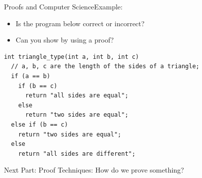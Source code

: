 \begin{frame}[fragile]{Proofs and Computer Science}{Example:}
  \begin{itemize}
    \item Is the program below correct or incorrect?
    \item Can you show by using a proof?
  \end{itemize}
  \bigskip

\begin{verbatim}
int triangle_type(int a, int b, int c)
  // a, b, c are the length of the sides of a triangle;
  if (a == b)
    if (b == c)
      return "all sides are equal";
    else
      return "two sides are equal";
  else if (b == c)
    return "two sides are equal";
  else
    return "all sides are different";
\end{verbatim}
\end{frame}

\begin{frame}{Next Part:}
  Proof Techniques: How do we prove something?
\end{frame}
